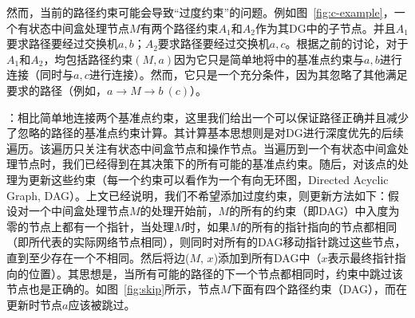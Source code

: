 然而，当前的路径约束可能会导致``过度约束''的问题。例如图~\ref{fig:c-example}，一个有状态中间盒处理节点$M$有两个路径约束$A_1$和$A_2$作为其DG中的子节点。并且$A_1$要求路径要经过交换机$a, b$；$A_2$要求路径要经过交换机$a, c$。根据之前的讨论，对于$A_1$和$A_2$，均包括路径约束$(M, a)$因为它只是简单地将中的基准点约束与$a, b$进行连接（同时与$a, c$进行连接）。然而，它只是一个充分条件，因为其忽略了其他满足要求的路径（例如，$a \rightarrow M \rightarrow b\ (c)$）。


：相比简单地连接两个基准点约束，这里我们给出一个可以保证路径正确并且减少了忽略的路径的基准点约束计算。其计算基本思想则是对DG进行深度优先的后续遍历。该遍历只关注有状态中间盒节点和操作节点。当遍历到一个有状态中间盒处理节点时，我们已经得到在其决策下的所有可能的基准点约束。随后，对该点的处理为更新这些约束（每一个约束可以看作为一个有向无环图，Directed Acyclic Graph, DAG）。上文已经说明，我们不希望添加过度约束，则更新方法如下：假设对一个中间盒处理节点$M$的处理开始前，$M$的所有的约束（即DAG）中入度为零的节点上都有一个指针，当处理$M$时，如果$M$的所有的指针指向的节点都相同（即所代表的实际网络节点相同），则同时对所有的DAG移动指针跳过这些节点，直到至少存在一个不相同。然后将边($M$, $x$)添加到所有DAG中（$x$表示最终指针指向的位置）。其思想是，当所有可能的路径的下一个节点都相同时，约束中跳过该节点也是正确的。如图~\ref{fig:skip}所示，节点$M$下面有四个路径约束（DAG），而在更新时节点$a$应该被跳过。


